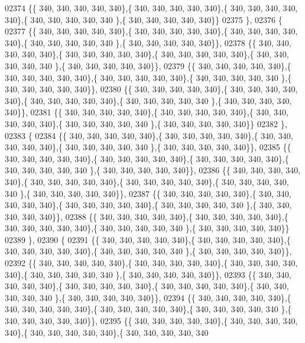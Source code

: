 \begin{DoxyCode}
02374 \{\{ 340, 340, 340, 340, 340\},\{ 340, 340, 340, 340, 340\},\{ 340, 340, 340, 340, 340\},\{ 340, 340, 340, 340, 340
      \},\{ 340, 340, 340, 340, 340\}\}
02375 \},
02376 \{
02377 \{\{ 340, 340, 340, 340, 340\},\{ 340, 340, 340, 340, 340\},\{ 340, 340, 340, 340, 340\},\{ 340, 340, 340, 340, 340
      \},\{ 340, 340, 340, 340, 340\}\},
02378 \{\{ 340, 340, 340, 340, 340\},\{ 340, 340, 340, 340, 340\},\{ 340, 340, 340, 340, 340\},\{ 340, 340, 340, 340, 340
      \},\{ 340, 340, 340, 340, 340\}\},
02379 \{\{ 340, 340, 340, 340, 340\},\{ 340, 340, 340, 340, 340\},\{ 340, 340, 340, 340, 340\},\{ 340, 340, 340, 340, 340
      \},\{ 340, 340, 340, 340, 340\}\},
02380 \{\{ 340, 340, 340, 340, 340\},\{ 340, 340, 340, 340, 340\},\{ 340, 340, 340, 340, 340\},\{ 340, 340, 340, 340, 340
      \},\{ 340, 340, 340, 340, 340\}\},
02381 \{\{ 340, 340, 340, 340, 340\},\{ 340, 340, 340, 340, 340\},\{ 340, 340, 340, 340, 340\},\{ 340, 340, 340, 340, 340
      \},\{ 340, 340, 340, 340, 340\}\}
02382 \},
02383 \{
02384 \{\{ 340, 340, 340, 340, 340\},\{ 340, 340, 340, 340, 340\},\{ 340, 340, 340, 340, 340\},\{ 340, 340, 340, 340, 340
      \},\{ 340, 340, 340, 340, 340\}\},
02385 \{\{ 340, 340, 340, 340, 340\},\{ 340, 340, 340, 340, 340\},\{ 340, 340, 340, 340, 340\},\{ 340, 340, 340, 340, 340
      \},\{ 340, 340, 340, 340, 340\}\},
02386 \{\{ 340, 340, 340, 340, 340\},\{ 340, 340, 340, 340, 340\},\{ 340, 340, 340, 340, 340\},\{ 340, 340, 340, 340, 340
      \},\{ 340, 340, 340, 340, 340\}\},
02387 \{\{ 340, 340, 340, 340, 340\},\{ 340, 340, 340, 340, 340\},\{ 340, 340, 340, 340, 340\},\{ 340, 340, 340, 340, 340
      \},\{ 340, 340, 340, 340, 340\}\},
02388 \{\{ 340, 340, 340, 340, 340\},\{ 340, 340, 340, 340, 340\},\{ 340, 340, 340, 340, 340\},\{ 340, 340, 340, 340, 340
      \},\{ 340, 340, 340, 340, 340\}\}
02389 \},
02390 \{
02391 \{\{ 340, 340, 340, 340, 340\},\{ 340, 340, 340, 340, 340\},\{ 340, 340, 340, 340, 340\},\{ 340, 340, 340, 340, 340
      \},\{ 340, 340, 340, 340, 340\}\},
02392 \{\{ 340, 340, 340, 340, 340\},\{ 340, 340, 340, 340, 340\},\{ 340, 340, 340, 340, 340\},\{ 340, 340, 340, 340, 340
      \},\{ 340, 340, 340, 340, 340\}\},
02393 \{\{ 340, 340, 340, 340, 340\},\{ 340, 340, 340, 340, 340\},\{ 340, 340, 340, 340, 340\},\{ 340, 340, 340, 340, 340
      \},\{ 340, 340, 340, 340, 340\}\},
02394 \{\{ 340, 340, 340, 340, 340\},\{ 340, 340, 340, 340, 340\},\{ 340, 340, 340, 340, 340\},\{ 340, 340, 340, 340, 340
      \},\{ 340, 340, 340, 340, 340\}\},
02395 \{\{ 340, 340, 340, 340, 340\},\{ 340, 340, 340, 340, 340\},\{ 340, 340, 340, 340, 340\},\{ 340, 340, 340, 340, 340

\end{DoxyCode}
